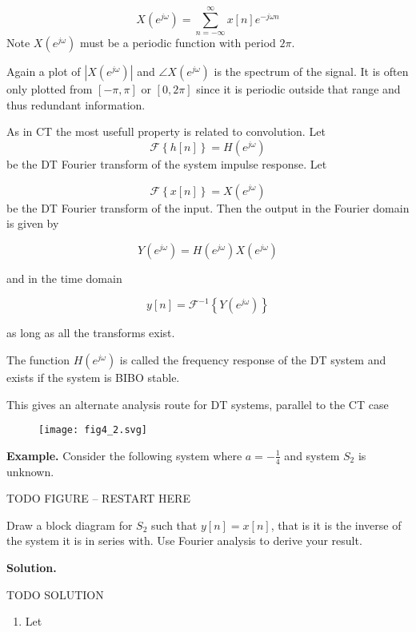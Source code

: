 \documentclass{article}
\begin{document}
\[
X\left(e^{j\omega}\right) = \sum\limits_{n = -\infty}^{\infty} x[n] e^{-j\omega n}
\]
Note $X\left(e^{j\omega}\right)$ must be a periodic function with period $2\pi$.

Again a plot of $|X\left(e^{j\omega}\right)|$ and $\angle X\left(e^{j\omega}\right)$ is the spectrum of the signal. It is often only plotted from $[-\pi, \pi]$ or $[0, 2\pi]$ since it is periodic outside that range and thus redundant information.

As in CT the most usefull property is related to convolution. Let
\[
\mathcal{F}\left\{ h[n]\right\} = H\left(e^{j\omega}\right)
\]
be the DT Fourier transform of the system impulse response. Let

\[
\mathcal{F}\left\{ x[n]\right\} = X\left(e^{j\omega}\right)
\]
be the DT Fourier transform of the input. Then the output in the Fourier domain is given by

\[
Y\left(e^{j\omega}\right) = H\left(e^{j\omega}\right) X\left(e^{j\omega}\right)
\]

and in the time domain

\[
y[n] = \mathcal{F}^{-1}\left\{ Y\left(e^{j\omega}\right) \right\}
\]

as long as all the transforms exist.

The function $H\left(e^{j\omega}\right)$ is called the frequency response of the DT system and exists if the system is BIBO stable.

This gives an alternate analysis route for DT systems, parallel to the CT case

\begin{figure}
  \centering
  \texttt{[image: fig4\_2.svg]}
\end{figure}

\textbf{Example.} Consider the following system where $a = -\frac{1}{4}$ and system $S_2$ is unknown.

TODO FIGURE -- RESTART HERE

Draw a block diagram for $S_2$ such that $y[n] = x[n]$, that is it is the inverse of the system it is in series with. Use Fourier analysis to derive your result.

\textbf{Solution.}

TODO SOLUTION

\begin{enumerate}
\item Let 
\end{enumerate}
\end{document}
